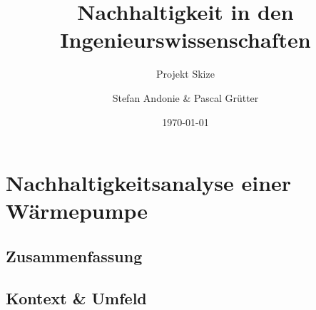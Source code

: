 \documentclass[10pt,paper=a4,final]{scrartcl}
\title{Nachhaltigkeit in den Ingenieurswissenschaften}
\subtitle{Projekt Skize}
\author{Stefan Andonie \& Pascal Grütter}
\date{\today{}}
\begin{document}
\section*{Nachhaltigkeitsanalyse einer Wärmepumpe}

\subsection*{Zusammenfassung}

\subsection*{Kontext \& Umfeld}

\subsection*{}
\subsection*{}
\subsection*{}
\subsection*{}
\subsection*{}
\end{document}
